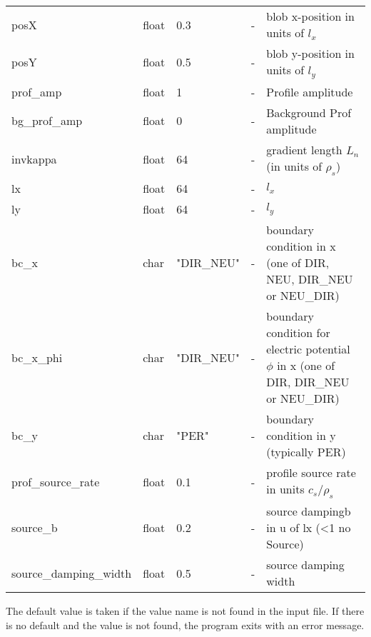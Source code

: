 \begin{longtable}{llll>{\RaggedRight}p{7cm}}
posX       & float &0.3    & - & blob x-position in units of $l_x$\\
posY       & float &0.5    & - & blob y-position in units of $l_y$ \\
prof\_amp    & float &1   & - &Profile amplitude \\
bg\_prof\_amp& float &0   & - &Background Prof amplitude  \\
invkappa   & float &64   & - &gradient length $L_n$ (in units of $\rho_s$)   \\
lx         & float &64   & - & $l_x$  \\
ly         & float &64  & - & $l_y$  \\
bc\_x   & char & "DIR\_NEU"      & - & boundary condition in x (one of DIR, NEU, DIR\_NEU or NEU\_DIR) \\
bc\_x\_phi   & char & "DIR\_NEU"      & - & boundary condition for electric potential $\phi$ in x (one of  DIR, DIR\_NEU or NEU\_DIR) \\
bc\_y   & char & "PER"      & - & boundary condition in y (typically PER) \\
prof\_source\_rate     & float &0.1  & - & profile source rate in units $c_s/\rho_s$ \\
source\_b             & float &0.2  & - & source dampingb in u of lx (<1 no Source)  \\
source\_damping\_width & float &0.5  & - & source damping width  \\
\bottomrule
\end{longtable}

The default value is taken if the value name is not found in the input file. If there is no default and
the value is not found,
the program exits with an error message.




